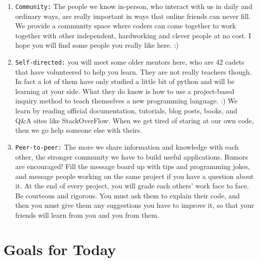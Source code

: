 \documentclass{42-en}
\begin{document}
\begin{enumerate}

\item \texttt{Community:} The people we know in-person, who interact with us in daily and ordinary ways, are really important in ways that online friends can never fill. We provide a community space where coders can come together to work together with other independent, hardworking and clever people at no cost. I hope you will find some people you really like here. :)

\item \texttt{Self-directed:} you will meet some older mentors here, who are 42 cadets that have volunteered to help you learn. They are not really teachers though. In fact a lot of them have only studied a little bit of python and will be learning at your side. What they do know is how to use a project-based inquiry method to teach themselves a new programming language. :) We learn by reading official documentation, tutorials, blog posts, books, and Q\&A sites like StackOverFlow. When we get tired of staring at our own code, then we go help someone else with theirs.

\item \texttt{Peer-to-peer:} The more we share information and knowledge with each other, the stronger community we have to build useful applications. Rumors are encouraged! Fill the message board up with tips and programming jokes, and message people working on the same project if you have a question about it. At the end of every project, you will grade each others' work face to face. Be courteous and rigorous. You must ask them to explain their code, and then you must give them any suggestions you have to improve it, so that your friends will learn from you and you from them.

\end{enumerate}

\startexercices



\chapter{Goals for Today}
\end{document}
